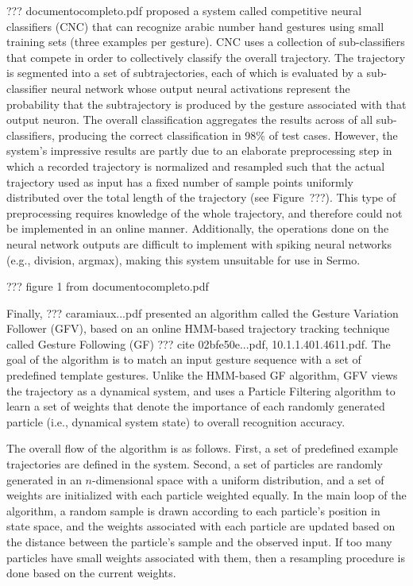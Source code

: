??? documentocompleto.pdf
proposed a system called competitive neural classifiers (CNC)
that can recognize arabic number hand gestures
using small training sets (three examples per gesture).
CNC uses a collection of sub-classifiers
that compete in order to collectively
classify the overall trajectory.
The trajectory is segmented
into a set of subtrajectories,
each of which is evaluated by
a sub-classifier neural network
whose output neural activations
represent the probability that
the subtrajectory is produced by
the gesture associated with that output neuron.
The overall classification aggregates the results
across of all sub-classifiers,
producing the correct classification
in 98\% of test cases.
However, the system's impressive results
are partly due to an elaborate preprocessing step
in which a recorded trajectory
is normalized and resampled
such that the actual trajectory used as input
has a fixed number of sample points
uniformly distributed over
the total length of the trajectory
(see Figure~???).
This type of preprocessing
requires knowledge of the whole trajectory,
and therefore could not be implemented
in an online manner.
Additionally, the operations done
on the neural network outputs
are difficult to implement
with spiking neural networks
(e.g., division, argmax),
making this system unsuitable
for use in Sermo.

??? figure 1 from documentocompleto.pdf

Finally,
??? caramiaux...pdf
presented an algorithm called the
Gesture Variation Follower (GFV),
based on an online HMM-based
trajectory tracking technique
called Gesture Following (GF)
??? cite 02bfe50e...pdf,
10.1.1.401.4611.pdf.
The goal of the algorithm is to match
an input gesture sequence
with a set of predefined template gestures.
Unlike the HMM-based GF algorithm,
GFV views the trajectory as a dynamical system,
and uses a Particle Filtering algorithm
to learn a set of weights
that denote the importance of
each randomly generated particle
(i.e., dynamical system state)
to overall recognition accuracy.

The overall flow of the algorithm
is as follows.
First, a set of predefined example trajectories
are defined in the system.
Second, a set of particles
are randomly generated
in an $n$-dimensional space
with a uniform distribution,
and a set of weights are initialized
with each particle weighted equally.
In the main loop of the algorithm,
a random sample is drawn
according to each particle's position
in state space,
and the weights associated with each particle
are updated based on the distance
between the particle's sample
and the observed input.
If too many particles have small weights
associated with them,
then a resampling procedure is done
based on the current weights.


